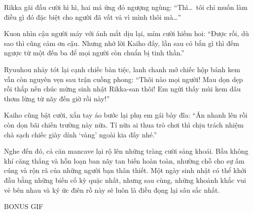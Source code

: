 \documentclass[../main.tex]{subfiles}
\begin{document}
Rikka gãi đầu cười hì hì, hai má ửng đỏ ngượng ngùng: ``Thì\dots\ tôi chỉ muốn làm điều gì đó đặc biệt cho người đã vất vả vì mình thôi mà\dots''

Kuon nhìn cậu người máy với ánh mắt dịu lại, mỉm cười hiếm hoi: ``Được rồi, dù sao thì cũng cảm ơn cậu. Nhưng nhớ lời Kaiho đấy, lần sau có bắn gì thì đếm ngược từ một đến ba để mọi người còn chuẩn bị tinh thần.''

Ryuuhou nhảy tót lại cạnh chiếc bàn tiệc, lanh chanh mở chiếc hộp bánh kem vẫn còn nguyên vẹn sau trận cuồng phong: ``Thôi nào mọi người! Mau dọn dẹp rồi thắp nến chúc mừng sinh nhật Rikka-san thôi! Em ngửi thấy mùi kem dâu thơm lừng từ nãy đến giờ rồi này!''

Kaiho cũng bật cười, xắn tay áo bước lại phụ em gái bày đĩa: ``Ăn nhanh lên rồi còn dọn bãi chiến trường này nữa. Tí nữa ai thua trò chơi thì chịu trách nhiệm chà sạch chiếc giày dính `vàng' ngoài kia đấy nhé.''

Nghe đến đó, cả căn mancave lại rộ lên những tràng cười sảng khoái. Bầu không khí căng thẳng và hỗn loạn ban nãy tan biến hoàn toàn, nhường chỗ cho sự ấm cúng và rộn rã của những người bạn thân thiết. Một ngày sinh nhật có thể khởi đầu bằng những biến cố kỳ quặc nhất, nhưng sau cùng, những khoảnh khắc vui vẻ bên nhau và ký ức điên rồ này sẽ luôn là điều đọng lại sâu sắc nhất.

\begin{center}
    {\ab BONUS GIF}
\end{center}
\end{document}
